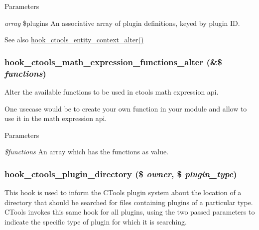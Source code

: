 \begin{DoxyParams}{Parameters}
\item[{\em array}]\$plugins An associative array of plugin definitions, keyed by plugin ID.\end{DoxyParams}
\begin{DoxySeeAlso}{See also}
\hyperlink{group__hooks_gad8e0232b98d84d2347a3cc1e26c3df09}{hook\_\-ctools\_\-entity\_\-context\_\-alter()} 
\end{DoxySeeAlso}
\hypertarget{group__hooks_ga133fb5b53380291a3348feffb3dd3364}{
\subsubsection[{hook\_\-ctools\_\-math\_\-expression\_\-functions\_\-alter}]{\setlength{\rightskip}{0pt plus 5cm}hook\_\-ctools\_\-math\_\-expression\_\-functions\_\-alter (\&\$ {\em functions})}}
\label{group__hooks_ga133fb5b53380291a3348feffb3dd3364}
Alter the available functions to be used in ctools math expression api.

One usecase would be to create your own function in your module and allow to use it in the math expression api.


\begin{DoxyParams}{Parameters}
\item[{\em \$functions}]An array which has the functions as value. \end{DoxyParams}
\hypertarget{group__hooks_gaf17a0de7a7ca6e6c30c766ea1e44715e}{
\subsubsection[{hook\_\-ctools\_\-plugin\_\-directory}]{\setlength{\rightskip}{0pt plus 5cm}hook\_\-ctools\_\-plugin\_\-directory (\$ {\em owner}, \/  \$ {\em plugin\_\-type})}}
\label{group__hooks_gaf17a0de7a7ca6e6c30c766ea1e44715e}
This hook is used to inform the CTools plugin system about the location of a directory that should be searched for files containing plugins of a particular type. CTools invokes this same hook for all plugins, using the two passed parameters to indicate the specific type of plugin for which it is searching.

